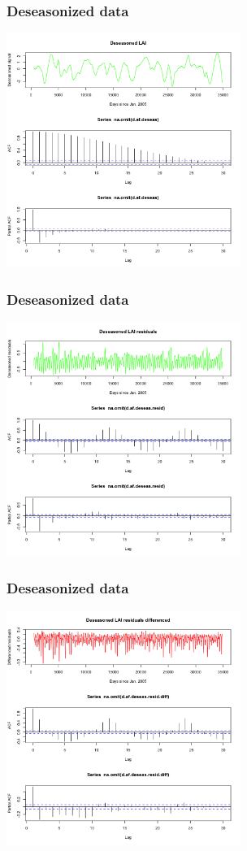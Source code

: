 \documentclass{beamer}
\begin{document}
\begin{frame}
    \frametitle{Deseasonized data}
    \includegraphics[height=3in]{../img/deseasonalization.png}
\end{frame}

\begin{frame}
    \frametitle{Deseasonized data}
    \includegraphics[height=3in]{../img/deseasonalization_resid.png}
\end{frame}

\begin{frame}
    \frametitle{Deseasonized data}
    \includegraphics[height=3in]{../img/deseasonalization_resid_difference.png}
\end{frame}
\end{document}
